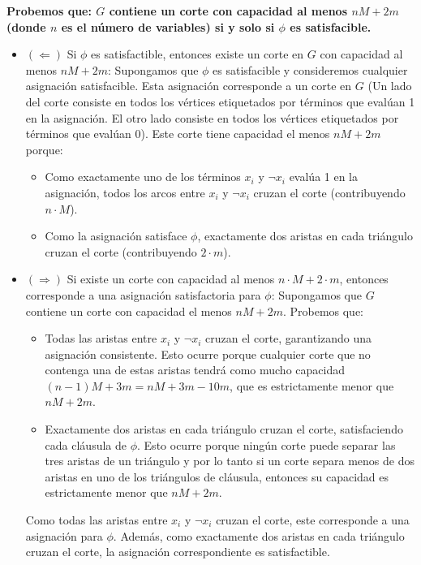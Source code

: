 \documentclass[a4paper,12pt]{article}
\begin{document}
\textbf{Probemos que: $G$ contiene un corte con capacidad al menos $nM+2m$ (donde $n$ es el número de variables) si y solo si $\phi$ es satisfacible.}
\begin{itemize}
    \item $(\Leftarrow)$ Si $\phi$ es satisfactible, entonces existe un corte en $G$ con capacidad al menos $nM + 2m$:
    Supongamos que $\phi$ es satisfacible y consideremos cualquier asignación satisfacible. Esta asignación corresponde a un corte en $G$ (Un lado del corte consiste en todos los vértices etiquetados por términos que evalúan 1 en la asignación. El otro lado consiste en todos los vértices etiquetados por términos que evalúan 0). 
    Este corte tiene capacidad el menos $nM+2m$ porque:
    \begin{itemize}
        \item Como exactamente uno de los términos $x_i$ y $\neg{x_i}$ evalúa 1 en la asignación, todos los arcos entre $x_i$ y $\neg x_i$ cruzan el corte (contribuyendo $n \cdot M$).
        \item Como la asignación satisface $\phi$, exactamente dos aristas en cada tri\'angulo cruzan el corte (contribuyendo $2 \cdot m$).
    \end{itemize}
    \item $(\Rightarrow)$ Si existe un corte con capacidad al menos $n \cdot M + 2 \cdot m$, entonces corresponde a una asignaci\'on satisfactoria para $\phi$:
    Supongamos que $G$ contiene un corte con capacidad el menos $nM+2m$. Probemos que:
    \begin{itemize}
        \item Todas las aristas entre $x_i$ y $\neg x_i$ cruzan el corte, garantizando una asignaci\'on consistente. Esto ocurre
        porque cualquier corte que no contenga una de estas aristas tendrá como mucho capacidad $(n-1)M+3m=nM+3m-10m$, que es estrictamente menor que $nM+2m$.
        \item Exactamente dos aristas en cada tri\'angulo cruzan el corte, satisfaciendo cada cl\'ausula de $\phi$. Esto ocurre porque ningún corte puede separar las tres aristas de un triángulo y
        por lo tanto si un corte separa menos de dos aristas en uno de los triángulos de cláusula, entonces su capacidad es estrictamente menor que $nM+2m$. 

    \end{itemize}
Como todas las aristas entre $x_i$ y $\neg x_i$ cruzan el corte, este corresponde a una asignación para $\phi$. 
Además, como exactamente dos aristas en cada tri\'angulo cruzan el corte, la asignaci\'on correspondiente es satisfactible.
\end{itemize}
\end{document}

